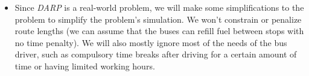 \begin{itemize}
    \item Since \textit{DARP} is a real-world problem, we will make some simplifications to the problem to simplify the problem's simulation. We won't constrain or penalize route lengths (we can assume that the buses can refill fuel between stops with no time penalty). We will also mostly ignore most of the needs of the bus driver, such as compulsory time breaks after driving for a certain amount of time or having limited working hours. 
\end{itemize}

\fi